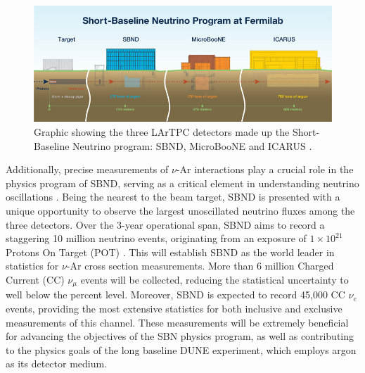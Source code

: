 \begin{figure}[htbp] 
\centering    
\includegraphics[width=1.0\textwidth]{SBN_program}
\caption[Short-Baseline Neutrino Program]{
Graphic showing the three LArTPC detectors made up the Short-Baseline Neutrino program: SBND, MicroBooNE and ICARUS \cite{SBNProgram}.
}
\label{fig:SBN_program}
\end{figure}

Additionally, precise measurements of $\nu$-Ar interactions play a crucial role in the physics program of SBND, serving as a critical element in understanding neutrino oscillations \cite{NuSTECWhitePaper}. 
Being the nearest to the beam target, SBND is presented with a unique opportunity to observe the largest unoscillated neutrino fluxes among the three detectors.
Over the 3-year operational span, SBND aims to record a staggering 10 million neutrino events, originating from an exposure of $1 \times 10^{21}$ Protons On Target (POT) \cite{SBNProgram}.
This will establish SBND as the world leader in statistics for $\nu$-Ar cross section measurements.
More than 6 million Charged Current (CC) $\nu_{\mu}$ events will be collected, reducing the statistical uncertainty to well below the percent level.
Moreover, SBND is expected to record 45,000 CC $\nu_{e}$ events, providing the most extensive statistics for both inclusive and exclusive measurements of this channel.
These measurements will be extremely beneficial for advancing the objectives of the SBN physics program, as well as contributing to the physics goals of the long baseline DUNE experiment, which employs argon as its detector medium.

